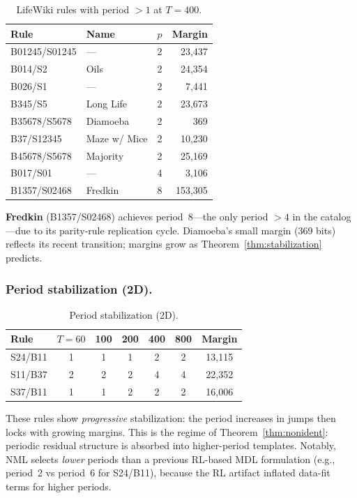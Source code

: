 \documentclass[letterpaper]{article}
\theoremstyle{definition}
\theoremstyle{remark}
\begin{document}
\begin{table}[!htb]
\centering
\caption{LifeWiki rules with period $> 1$ at $T{=}400$.}\label{tab:lifewiki-higher}
\begin{tabular}{llcr}
\toprule
Rule & Name & $p$ & Margin \\
\midrule
B01245/S01245 & --- & 2 & 23{,}437 \\
B014/S2       & Oils & 2 & 24{,}354 \\
B026/S1       & --- & 2 & 7{,}441 \\
B345/S5       & Long Life & 2 & 23{,}673 \\
B35678/S5678  & Diamoeba & 2 & 369 \\
B37/S12345    & Maze w/ Mice & 2 & 10{,}230 \\
B45678/S5678  & Majority & 2 & 25{,}169 \\
B017/S01      & --- & 4 & 3{,}106 \\
B1357/S02468  & Fredkin & 8 & 153{,}305 \\
\bottomrule
\end{tabular}
\end{table}

\textbf{Fredkin} (B1357/S02468) achieves period~8---the only period $>4$ in the catalog---due to its parity-rule replication cycle.
Diamoeba's small margin (369 bits) reflects its recent transition; margins grow as Theorem~\ref{thm:stabilization} predicts.

\subsubsection{Period stabilization (2D).}

\begin{table}[!htb]
\centering
\caption{Period stabilization (2D).}\label{tab:2d-stab}
\begin{tabular}{lcccccc}
\toprule
Rule & $T{=}60$ & 100 & 200 & 400 & 800 & Margin \\
\midrule
S24/B11 & 1 & 1 & 1 & 2 & 2 & 13{,}115 \\
S11/B37 & 2 & 2 & 2 & 4 & 4 & 22{,}352 \\
S37/B11 & 1 & 1 & 2 & 2 & 2 & 16{,}006 \\
\bottomrule
\end{tabular}
\end{table}

These rules show \emph{progressive} stabilization: the period increases in jumps then locks with growing margins.
This is the regime of Theorem~\ref{thm:nonident}: periodic residual structure is absorbed into higher-period templates.
Notably, NML selects \emph{lower} periods than a previous RL-based MDL formulation (e.g., period~2 vs period~6 for S24/B11), because the RL artifact inflated data-fit terms for higher periods.
\end{document}
